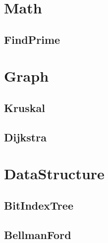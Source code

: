 \section{Math}
    \subsection{FindPrime}
        
\section{Graph}
    \subsection{Kruskal}
        
    \subsection{Dijkstra}
        
\section{DataStructure}
    \subsection{BitIndexTree}
        
    \subsection{BellmanFord}
        
